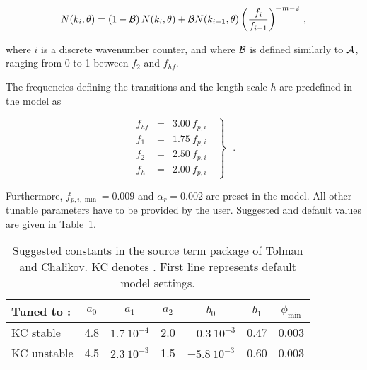 
\begin{equation}
N(k_i,\theta) = \left ( 1 - {\cal{B}} \right ) N(k_{i},\theta) +
{\cal{B}} N(k_{i-1},\theta) \left ( \frac{f_i}{f_{i-1}}\right ) ^{-m-2}
\: , \label{eq:smtail}
\end{equation}

\noindent
where $i$ is a discrete wavenumber counter, and where $\cal{B}$ is defined
similarly to $\cal{A}$, ranging from 0 to 1 between $f_2$ and $f_{hf}$.

The frequencies defining the transitions and the length scale $h$ are
predefined in the model as


\begin{equation} \left . \begin{array}{lll}
  f_{hf} & = & 3.00 \: f_{p,i}  \\
  f_1 & = & 1.75 \: f_{p,i}  \\
  f_2 & = & 2.50 \: f_{p,i}  \\
  f_h & = & 2.00 \: f_{p,i}
\end{array} \:\:\: \right \rbrace \:\:\: . \label{eq:TC_f} \end{equation}

\noindent
Furthermore, $f_{p,i,\min} = 0.009$ and $\alpha_r = 0.002$ are preset in the
model. All other tunable parameters have to be provided by the user. Suggested
and default values are given in Table~\ref{tab:TC_par}.


\begin{table} \begin{center}
\begin{tabular}{|l|c|c|c|c|c|c|} \hline \hline
Tuned to :  & $a_0$ &      $a_1$       & $a_2$ &
            $b_0$           & $b_1$  & $\phi_{\min} $\\ \hline
KC stable   &  4.8  & $1.7 \: 10^{-4}$ &  2.0  &
 $ \:\:\:\: 0.3 \: 10^{-3}$ &  0.47  &  0.003  \\
KC unstable &  4.5  & $2.3 \: 10^{-3}$ &  1.5  &
 $     -5.8 \: 10^{-3}$     &  0.60  &  0.003  \\ \hline \hline
\end{tabular} \end{center}
\caption{Suggested constants in the source term package of Tolman and
         Chalikov. KC denotes \cite{art:KC92,ibk:KC94}. First line represents
         default model settings.}
\label{tab:TC_par} \botline \end{table}

